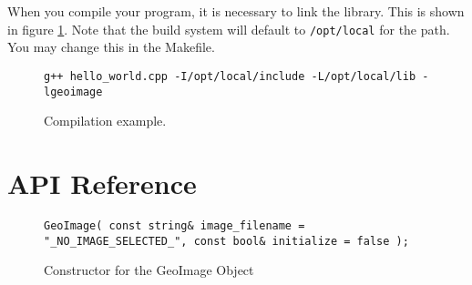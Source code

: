 \documentclass[10pt]{report}
\begin{document}
When you compile your program, it is necessary to link the library. This
is shown in figure \ref{fig:basic02}.  Note that the build system will 
default to \texttt{/opt/local} for the path.  You may change this in the Makefile.


\begin{figure}[!h]
\begin{verbatim}
g++ hello_world.cpp -I/opt/local/include -L/opt/local/lib -lgeoimage
\end{verbatim}
\caption{Compilation example.}
\label{fig:basic02}
\end{figure}



\section*{API Reference}

\begin{figure}[!h]
\begin{lstlisting}
GeoImage( const string& image_filename = "_NO_IMAGE_SELECTED_", const bool& initialize = false );
\end{lstlisting}
\caption{Constructor for the GeoImage Object}
\label{fig:geoimage01}
\end{figure}
\end{document}
